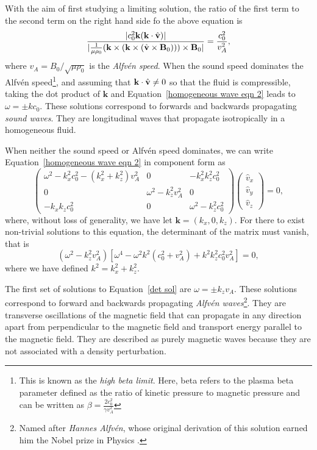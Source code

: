 With the aim of first studying a limiting solution, the ratio of the first term to the second term on the right hand side fo the above equation is
\begin{equation}
	\frac{|c_0^2\mathbf{k}(\mathbf{k}\cdot\hat{\mathbf{v}})|}{|\frac{1}{\mu\rho_0}(\mathbf{k}\times(\mathbf{k}\times(\hat{\mathbf{v}}\times\mathbf{B}_0)))\times\mathbf{B}_0|} = \frac{c_0^2}{v_A^2},
\end{equation}
where $v_A = B_0/\sqrt{\mu\rho_0}$ is the \textit{Alfv\'{e}n speed}. When the sound speed dominates the Alfv\'{e}n speed\footnote{This is known as the \textit{high beta limit}. Here, beta refers to the plasma beta parameter defined as the ratio of kinetic pressure to magnetic pressure and can be written as $\beta = \frac{2c_0^2}{\gamma v_A^2}$}, and assuming that $\mathbf{k}\cdot\hat{\mathbf{v}} \neq 0$ so that the fluid is compressible, taking the dot product of $\mathbf{k}$ and Equation~\eqref{homogeneous wave eqn 2} leads to $\omega = \pm kc_0$. These solutions correspond to forwards and backwards propagating \textit{sound waves}. They are longitudinal waves that propagate isotropically in a homogeneous fluid.

When neither the sound speed or Alfv\'{e}n speed dominates, we can write Equation~\eqref{homogeneous wave eqn 2} in component form as
\begin{equation}
	\left(\begin{matrix}
		\omega^2 - k_x^2c_0^2 - (k_x^2 + k_z^2)v_A^2 & 0 & -k_x^2k_z^2c_0^2 \\
		0 & \omega^2 - k_z^2v_A^2 & 0 \\
		-k_xk_zc_0^2 & 0 & \omega^2 - k_z^2c_0^2
	\end{matrix}\right)
	\left(\begin{matrix}
		\hat{v}_x \\
		\hat{v}_y \\
		\hat{v}_z
	\end{matrix} \right) = 0,
\end{equation}
where, without loss of generality, we have let $\mathbf{k} = (k_x, 0, k_z)$. For there to exist non-trivial solutions to this equation, the determinant of the matrix must vanish, that is
\begin{equation}
	(\omega^2 - k_z^2v_A^2)\left[\omega^4 - \omega^2k^2(c_0^2 + v_A^2) + k^2k_z^2c_0^2v_A^2 \right] = 0, \label{det sol}
\end{equation}
where we have defined $k^2 = k_x^2 + k_z^2$.

The first set of solutions to Equation~\eqref{det sol} are $\omega = \pm k_zv_A$. These solutions correspond to forward and backwards propagating \textit{Alfv\'{e}n waves}\footnote{Named after \textit{Hannes Alfv\'{e}n}, whose original derivation of this solution earned him the Nobel prize in Physics \citep{alf42}.}. They are transverse oscillations of the magnetic field that can propagate in any direction apart from perpendicular to the magnetic field and transport energy parallel to the magnetic field. They are described as purely magnetic waves because they are not associated with a density perturbation.

